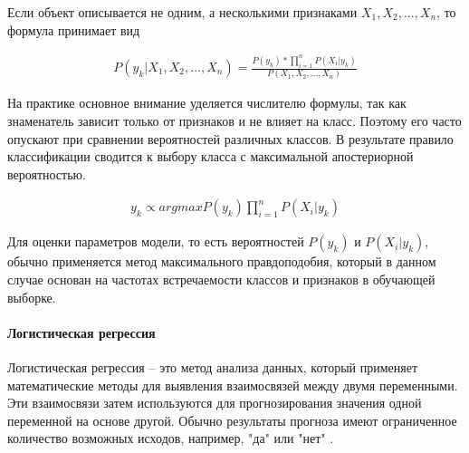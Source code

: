 Если объект описывается не одним, а несколькими признаками $X_1, X_2, ... , X_n$, то формула принимает вид

\begin{gather}
    P(y_k|X_1, X_2, ... , X_n) = \frac{P(y_k) * \displaystyle\prod_{i=1}^{n}{P(X_i|y_k)}}{P(X_1, X_2, ... , X_n)}
\end{gather}


На практике основное внимание уделяется числителю формулы, так как знаменатель зависит только от признаков и не влияет на класс. Поэтому его часто опускают при сравнении вероятностей различных классов. В результате правило классификации сводится к выбору класса с максимальной апостериорной вероятностью.

\begin{gather}
    y_k \propto arg max P(y_k) \displaystyle\prod_{i=1}^{n}{P(X_i|y_k)}
\end{gather}

Для оценки параметров модели, то есть вероятностей $P(y_k)$ и $P(X_i|y_k)$, обычно применяется метод максимального правдоподобия, который в данном случае основан на частотах встречаемости классов и признаков в обучающей выборке.



\paragraph{Логистическая регрессия}

Логистическая регрессия – это метод анализа данных, который применяет математические методы для выявления взаимосвязей между двумя переменными. Эти взаимосвязи затем используются для прогнозирования значения одной переменной на основе другой. Обычно результаты прогноза имеют ограниченное количество возможных исходов, например, "да" или "нет" .

